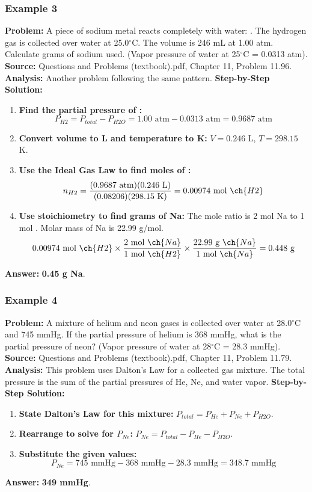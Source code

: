 \documentclass{article}
\begin{document}
\subsubsection{Example 3}
\textbf{Problem:} A piece of sodium metal reacts completely with water: . The hydrogen gas is collected over water at 25.0$^\circ$C. The volume is 246 mL at 1.00 atm. Calculate grams of sodium used. (Vapor pressure of water at 25$^\circ$C = 0.0313 atm).
\textbf{Source:} Questions and Problems (textbook).pdf, Chapter 11, Problem 11.96.
\textbf{Analysis:} Another problem following the same pattern.
\textbf{Step-by-Step Solution:}
\begin{enumerate}
    \item \textbf{Find the partial pressure of :}
    \[ P_{H2} = P_{total} - P_{H2O} = 1.00 \text{ atm} - 0.0313 \text{ atm} = 0.9687 \text{ atm} \]
    \item \textbf{Convert volume to L and temperature to K:} $V = 0.246$ L, $T = 298.15$ K.
    \item \textbf{Use the Ideal Gas Law to find moles of :}
    \[ n_{H2} = \frac{(0.9687 \text{ atm})(0.246 \text{ L})}{(0.08206)(298.15 \text{ K})} = 0.00974 \text{ mol } \ch{H2} \]
    \item \textbf{Use stoichiometry to find grams of Na:} The mole ratio is 2 mol Na to 1 mol . Molar mass of Na is 22.99 g/mol.
    \[ 0.00974 \text{ mol } \ch{H2} \times \frac{2 \text{ mol } \ch{Na}}{1 \text{ mol } \ch{H2}} \times \frac{22.99 \text{ g } \ch{Na}}{1 \text{ mol } \ch{Na}} = 0.448 \text{ g} \]
\end{enumerate}
\textbf{Answer:} \textbf{0.45 g Na}.

\subsubsection{Example 4}
\textbf{Problem:} A mixture of helium and neon gases is collected over water at 28.0$^\circ$C and 745 mmHg. If the partial pressure of helium is 368 mmHg, what is the partial pressure of neon? (Vapor pressure of water at 28$^\circ$C = 28.3 mmHg).
\textbf{Source:} Questions and Problems (textbook).pdf, Chapter 11, Problem 11.79.
\textbf{Analysis:} This problem uses Dalton's Law for a collected gas mixture. The total pressure is the sum of the partial pressures of He, Ne, and water vapor.
\textbf{Step-by-Step Solution:}
\begin{enumerate}
    \item \textbf{State Dalton's Law for this mixture:} $P_{total} = P_{He} + P_{Ne} + P_{H2O}$.
    \item \textbf{Rearrange to solve for $P_{Ne}$:} $P_{Ne} = P_{total} - P_{He} - P_{H2O}$.
    \item \textbf{Substitute the given values:}
    \[ P_{Ne} = 745 \text{ mmHg} - 368 \text{ mmHg} - 28.3 \text{ mmHg} = 348.7 \text{ mmHg} \]
\end{enumerate}
\textbf{Answer:} \textbf{349 mmHg}.
\end{document}
